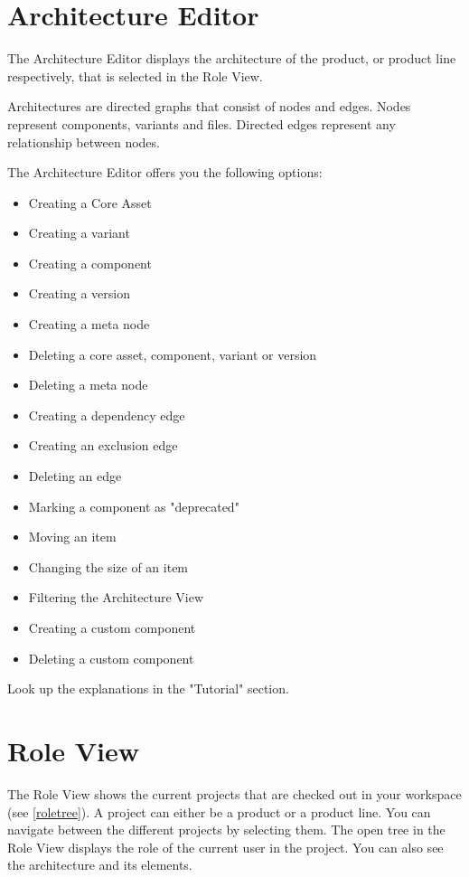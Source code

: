 \section{Architecture Editor}

The Architecture Editor displays the architecture of the product,
or product line respectively, that is selected in the Role View. \par

Architectures are directed graphs that consist of nodes and edges. 
Nodes represent components, variants and files. Directed edges represent
any relationship between nodes.\par

The Architecture Editor offers you the following options:
\begin{itemize}
	\item Creating a Core Asset
	\item Creating a variant
	\item Creating a component
	\item Creating a version
	\item Creating a meta node
	\item Deleting a core asset, component, variant or version
	\item Deleting a meta node
	\item Creating a dependency edge
	\item Creating an exclusion edge
	\item Deleting an edge
	\item Marking a component as "deprecated"
	\item Moving an item
	\item Changing the size of an item
	\item Filtering the Architecture View
	\item Creating a custom component
	\item Deleting a custom component
\end{itemize}
Look up the explanations in the "Tutorial" section.

\section{Role View}

The Role View shows the current projects that are checked out in your workspace 
(see \ref{roletree}).
A project can either be a product or a product line. You can navigate between the 
different projects by selecting them. The open tree in the Role View displays the
role of the current user in the project. You can also see the architecture and its 
elements.

